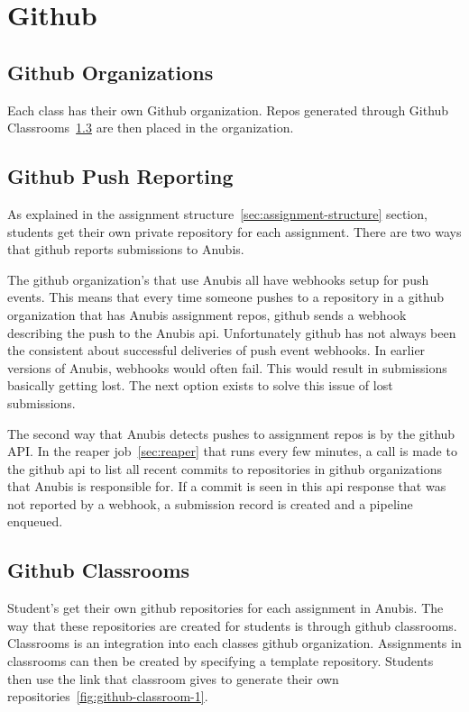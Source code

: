 \section{Github}\label{sec:github}

\subsection{Github Organizations}\label{subsec:github-orgs}

Each class has their own Github organization.
Repos generated through Github Classrooms~\ref{subsec:github-classrooms}
are then placed in the organization.

\subsection{Github Push Reporting}\label{subsec:github-push-reporting}

As explained in the assignment structure~\ref{sec:assignment-structure} section,
students get their own private repository for each assignment.
There are two ways that github reports submissions to Anubis.

The github organization's that use Anubis all have webhooks setup for push events.
This means that every time someone pushes to a repository in a github organization
that has Anubis assignment repos, github sends a webhook describing the push to
the Anubis api.
Unfortunately github has not always been the consistent about successful deliveries of
push event webhooks.
In earlier versions of Anubis, webhooks would often fail.
This would result in submissions basically getting lost.
The next option exists to solve this issue of lost submissions.

The second way that Anubis detects pushes to assignment repos is by the github API.
In the reaper job~\ref{sec:reaper} that runs every few minutes, a call is made to the
github api to list all recent commits to repositories in github organizations that
Anubis is responsible for.
If a commit is seen in this api response that was not reported by a webhook,
a submission record is created and a pipeline enqueued.

\subsection{Github Classrooms}\label{subsec:github-classrooms}

Student's get their own github repositories for each assignment in Anubis.
The way that these repositories are created for students is through github classrooms.
Classrooms is an integration into each classes github organization.
Assignments in classrooms can then be created by specifying a template repository.
Students then use the link that classroom gives to generate their own repositories~\ref{fig:github-classroom-1}.


